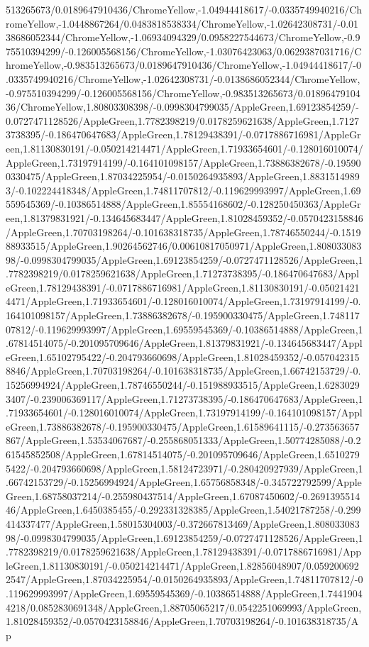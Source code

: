 {\begin{tikzternal}
{513265673/0.0189647910436/ChromeYellow,-1.04944418617/-0.0335749940216/ChromeYellow,-1.0448867264/0.0483818538334/ChromeYellow,-1.02642308731/-0.0138686052344/ChromeYellow,-1.06934094329/0.0958227544673/ChromeYellow,-0.975510394299/-0.126005568156/ChromeYellow,-1.03076423063/0.0629387031716/ChromeYellow,-0.983513265673/0.0189647910436/ChromeYellow,-1.04944418617/-0.0335749940216/ChromeYellow,-1.02642308731/-0.0138686052344/ChromeYellow,-0.975510394299/-0.126005568156/ChromeYellow,-0.983513265673/0.0189647910436/ChromeYellow,1.80803308398/-0.0998304799035/AppleGreen,1.69123854259/-0.0727471128526/AppleGreen,1.7782398219/0.0178259621638/AppleGreen,1.71273738395/-0.186470647683/AppleGreen,1.78129438391/-0.0717886716981/AppleGreen,1.81130830191/-0.050214214471/AppleGreen,1.71933654601/-0.128016010074/AppleGreen,1.73197914199/-0.164101098157/AppleGreen,1.73886382678/-0.195900330475/AppleGreen,1.87034225954/-0.0150264935893/AppleGreen,1.88315149893/-0.102224418348/AppleGreen,1.74811707812/-0.119629993997/AppleGreen,1.69559545369/-0.10386514888/AppleGreen,1.85554168602/-0.128250450363/AppleGreen,1.81379831921/-0.134645683447/AppleGreen,1.81028459352/-0.0570423158846/AppleGreen,1.70703198264/-0.101638318735/AppleGreen,1.78746550244/-0.151988933515/AppleGreen,1.90264562746/0.00610817050971/AppleGreen,1.80803308398/-0.0998304799035/AppleGreen,1.69123854259/-0.0727471128526/AppleGreen,1.7782398219/0.0178259621638/AppleGreen,1.71273738395/-0.186470647683/AppleGreen,1.78129438391/-0.0717886716981/AppleGreen,1.81130830191/-0.050214214471/AppleGreen,1.71933654601/-0.128016010074/AppleGreen,1.73197914199/-0.164101098157/AppleGreen,1.73886382678/-0.195900330475/AppleGreen,1.74811707812/-0.119629993997/AppleGreen,1.69559545369/-0.10386514888/AppleGreen,1.67814514075/-0.201095709646/AppleGreen,1.81379831921/-0.134645683447/AppleGreen,1.65102795422/-0.204793660698/AppleGreen,1.81028459352/-0.0570423158846/AppleGreen,1.70703198264/-0.101638318735/AppleGreen,1.66742153729/-0.15256994924/AppleGreen,1.78746550244/-0.151988933515/AppleGreen,1.62830293407/-0.239006369117/AppleGreen,1.71273738395/-0.186470647683/AppleGreen,1.71933654601/-0.128016010074/AppleGreen,1.73197914199/-0.164101098157/AppleGreen,1.73886382678/-0.195900330475/AppleGreen,1.61589641115/-0.273563657867/AppleGreen,1.53534067687/-0.255868051333/AppleGreen,1.50774285088/-0.261545852508/AppleGreen,1.67814514075/-0.201095709646/AppleGreen,1.65102795422/-0.204793660698/AppleGreen,1.58124723971/-0.280420927939/AppleGreen,1.66742153729/-0.15256994924/AppleGreen,1.65756858348/-0.345722792599/AppleGreen,1.68758037214/-0.255980437514/AppleGreen,1.67087450602/-0.269139551446/AppleGreen,1.6450385455/-0.292331328385/AppleGreen,1.54021787258/-0.299414337477/AppleGreen,1.58015304003/-0.372667813469/AppleGreen,1.80803308398/-0.0998304799035/AppleGreen,1.69123854259/-0.0727471128526/AppleGreen,1.7782398219/0.0178259621638/AppleGreen,1.78129438391/-0.0717886716981/AppleGreen,1.81130830191/-0.050214214471/AppleGreen,1.82856048907/0.0592006922547/AppleGreen,1.87034225954/-0.0150264935893/AppleGreen,1.74811707812/-0.119629993997/AppleGreen,1.69559545369/-0.10386514888/AppleGreen,1.74419044218/0.0852830691348/AppleGreen,1.88705065217/0.0542251069993/AppleGreen,1.81028459352/-0.0570423158846/AppleGreen,1.70703198264/-0.101638318735/Ap}
\end{tikzternal}}
